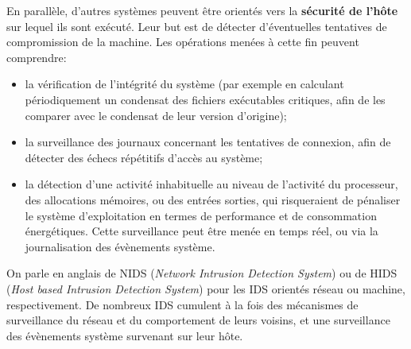 En parallèle, d'autres systèmes peuvent être orientés vers la \textbf{sécurité de l'hôte} sur lequel ils sont exécuté.
Leur but est de détecter d'éventuelles tentatives de compromission de la machine.
Les opérations menées à cette fin peuvent comprendre:
\begin{itemize}
    \item la vérification de l'intégrité du système (par exemple en calculant périodiquement un condensat des fichiers exécutables critiques, afin de les comparer avec le condensat de leur version d'origine);
    \item la surveillance des journaux concernant les tentatives de connexion, afin de détecter des échecs répétitifs d'accès au système;
    \item la détection d'une activité inhabituelle au niveau de l'activité du processeur, des allocations mémoires, ou des entrées sorties, qui risqueraient de pénaliser le système d'exploitation en termes de performance et de consommation énergétiques. Cette surveillance peut être menée en temps réel, ou via la journalisation des évènements système.
\end{itemize}
On parle en anglais de NIDS (\textit{Network Intrusion Detection System}) ou de HIDS (\textit{Host based Intrusion Detection System}) pour les IDS orientés réseau ou machine, respectivement.
De nombreux IDS cumulent à la fois des mécanismes de surveillance du réseau et du comportement de leurs voisins, et une surveillance des évènements système survenant sur leur hôte.

